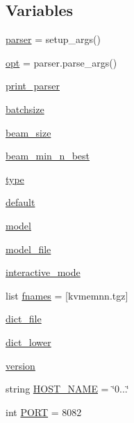 \subsection*{Variables}
\begin{DoxyCompactItemize}
\item 
\hyperlink{namespaceinteractive_affc28a281e9fbc688b1515e62dc694db}{parser} = setup\+\_\+args()
\item 
\hyperlink{namespaceinteractive_a4b1cc0a00aa97ce62621d2a9996fe6ff}{opt} = parser.\+parse\+\_\+args()
\item 
\hyperlink{namespaceinteractive_abf63ff4b74ab5876420db088893db0f7}{print\+\_\+parser}
\item 
\hyperlink{namespaceinteractive_a48211e6ceacecf473b131232efbb161a}{batchsize}
\item 
\hyperlink{namespaceinteractive_afd41c71f81720b70b28d9b4afe6bc7db}{beam\+\_\+size}
\item 
\hyperlink{namespaceinteractive_ac3dcd72d3c8650f4bd855aea64f42fdd}{beam\+\_\+min\+\_\+n\+\_\+best}
\item 
\hyperlink{namespaceinteractive_a29ac438ce85aa9b2596889acd9d2e0fc}{type}
\item 
\hyperlink{namespaceinteractive_a2c33aa51409c0f1449a8e71af675f5d3}{default}
\item 
\hyperlink{namespaceinteractive_a448ab5ee029278d8a10d63437f2d9f61}{model}
\item 
\hyperlink{namespaceinteractive_a5574770c2f057a41cb28d00dfd2db193}{model\+\_\+file}
\item 
\hyperlink{namespaceinteractive_a6533403c08a820239c75fb65bf87fe87}{interactive\+\_\+mode}
\item 
list \hyperlink{namespaceinteractive_a30fdc1360f54064b93e4ec2ccbe7316d}{fnames} = \mbox{[}\textquotesingle{}kvmemnn.\+tgz\textquotesingle{}\mbox{]}
\item 
\hyperlink{namespaceinteractive_a79970bff063518010e38914b9a7a0dfe}{dict\+\_\+file}
\item 
\hyperlink{namespaceinteractive_a01196cf1cff43a645a74f16b6771c5be}{dict\+\_\+lower}
\item 
\hyperlink{namespaceinteractive_a878d19aeae208ee1dc94b3a9c651b443}{version}
\item 
string \hyperlink{namespaceinteractive_a38d457310aa09e965304a7a638f605ca}{H\+O\+S\+T\+\_\+\+N\+A\+ME} = \char`\"{}0...\char`\"{}
\item 
int \hyperlink{namespaceinteractive_a29341b624435b00b983e5a91adfdc374}{P\+O\+RT} = 8082

\end{DoxyCompactItemize}
